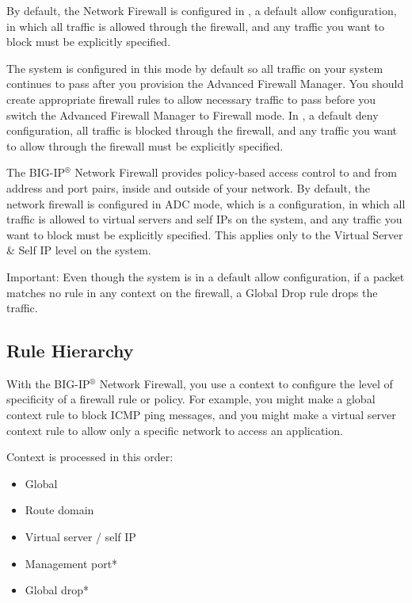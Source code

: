 \documentclass[letterpaper,10pt,english]{sphinxmanual}
\begin{document}
By default, the Network Firewall is configured in , a
default allow configuration, in which all traffic is allowed through the
firewall, and any traffic you want to block must be explicitly
specified.

The system is configured in this mode by default so all traffic on your
system continues to pass after you provision the Advanced Firewall
Manager. You should create appropriate firewall rules to allow necessary
traffic to pass before you switch the Advanced Firewall Manager to
Firewall mode. In , a default deny configuration, all
traffic is blocked through the firewall, and any traffic you want to
allow through the firewall must be explicitly specified.

The BIG-IP$^{\text{®}}$ Network Firewall provides policy-based access
control to and from address and port pairs, inside and outside of your
network. By default, the network firewall is configured in ADC mode,
which is a  configuration, in which all traffic is
allowed to virtual servers and self IPs on the system, and any traffic
you want to block must be explicitly specified. This applies only to the
Virtual Server \& Self IP level on the system.

Important: Even though the system is in a default allow configuration,
if a packet matches no rule in any context on the firewall, a Global
Drop rule drops the traffic.


\subsection{Rule Hierarchy}
\label{\detokenize{class1/module1/lab3:rule-hierarchy}}
With the BIG-IP$^{\text{®}}$ Network Firewall, you use a context to
configure the level of specificity of a firewall rule or policy. For
example, you might make a global context rule to block ICMP ping
messages, and you might make a virtual server context rule to allow only
a specific network to access an application.

Context is processed in this order:
\begin{itemize}
\item {} 
Global

\item {} 
Route domain

\item {} 
Virtual server / self IP

\item {} 
Management port*

\item {} 
Global drop*

\end{itemize}
\end{document}
